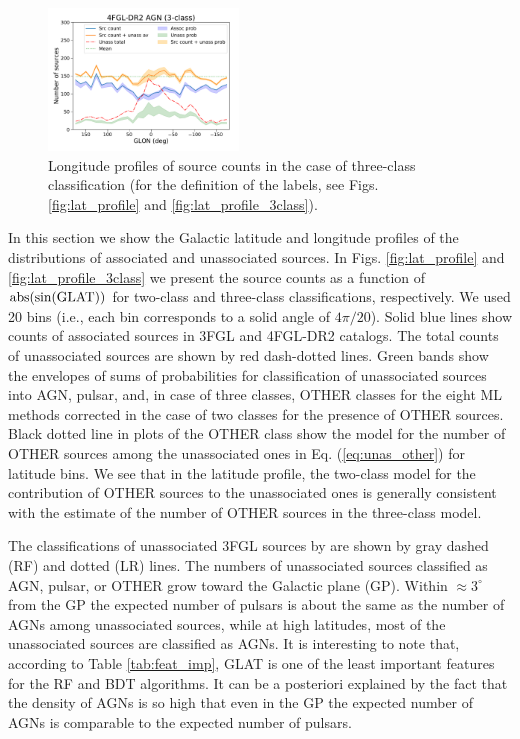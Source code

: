 \documentclass[referee]{aa} %
\begin{document}
\begin{figure}[h]
\includegraphics[width=0.45\textwidth]{plots/lon_profile_AGN_4FGL-DR2_3classes.pdf}
\caption{Longitude profiles of source counts in the case of three-class classification (for the definition of the labels, see Figs. \ref{fig:lat_profile} and \ref{fig:lat_profile_3class}).}  
\label{fig:lon_profile_3class}
\end{figure}


In this section we show the Galactic latitude and longitude profiles of the distributions of associated and unassociated sources.
In Figs. \ref{fig:lat_profile} and \ref{fig:lat_profile_3class} we present the source counts as a function of ${\rm abs(sin(GLAT))}$ 
for two-class and three-class classifications, respectively.
We used 20 bins (i.e., each bin corresponds to a solid angle of $4 \pi / 20$). 
Solid blue lines show counts of associated sources in 3FGL and 4FGL-DR2  catalogs.
The total counts of unassociated sources are shown by red dash-dotted lines.
Green bands show the envelopes of sums of probabilities for classification of unassociated sources into AGN, pulsar, and, in case of three classes, OTHER classes for the eight ML methods corrected in the case of two classes for the presence of OTHER sources.
Black dotted line in plots of the OTHER class show the model for the number of OTHER sources among the unassociated ones
in Eq. (\ref{eq:unas_other}) for latitude bins.
We see that in the latitude profile, the two-class model for the contribution of OTHER sources to the unassociated ones is generally consistent with the estimate of the number of OTHER sources in the three-class model.

The classifications of unassociated 3FGL sources by \cite{2016ApJ...820....8S} are shown by gray dashed (RF) and dotted (LR) lines.
The numbers of unassociated sources classified as AGN, pulsar, or OTHER grow toward the Galactic plane (GP).
Within $\approx 3^\circ$ from the GP the expected number of pulsars is about the same as the number of AGNs among unassociated sources, while at high latitudes, most of the unassociated sources are classified as AGNs.
It is interesting to note that, according to Table \ref{tab:feat_imp}, GLAT is one of the least important features for the RF and BDT algorithms.
It can be a posteriori explained by the fact that the density of AGNs is so high that even in the GP the expected number of AGNs is comparable to the expected number of pulsars.
\end{document}
